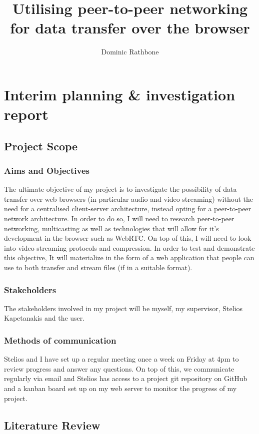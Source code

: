 \documentclass[]{report}
\title{Utilising peer-to-peer networking for data transfer over the browser}
\author{Dominic Rathbone}
\begin{document}
\maketitle
\tableofcontents
\listoftodos


\chapter{Interim planning \& investigation report}
	\section{Project Scope}
		\subsection*{Aims and Objectives}
			The ultimate objective of my project is to investigate the possibility of data transfer over web browsers (in particular audio and video streaming) without the need for a centralised client-server architecture, instead opting for a peer-to-peer network architecture. In order to do so, I will need to research peer-to-peer networking, multicasting as well as technologies that will allow for it's development in the browser such as WebRTC. On top of this, I will need to look into video streaming protocols and compression. In order to test and demonstrate this objective, It will materialize in the form of a web application that people can use to both transfer and stream files (if in a suitable format).
		\subsection*{Stakeholders}
			The stakeholders involved in my project will be myself, my supervisor, Stelios Kapetanakis and the user.
		\subsection*{Methods of communication}
			Stelios and I have set up a regular meeting once a week on Friday at 4pm to review progress and answer any questions. On top of this, we communicate regularly via email and Stelios has access to a project git repository on GitHub and a kanban board set up on my web server to monitor the progress of my project. 
			
	\section{Literature Review}
\end{document}
